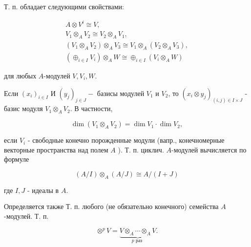 \documentclass[10pt]{article}
\begin{document}
Т. п. обладает следующими свойствами:



\[

\begin{gathered}

A \otimes V^{i} \cong V, \\

V_{1} \otimes_{A} V_{2} \cong V_{2} \otimes_{A} V_{1}, \\

\left(V_{1} \otimes_{A} V_{2}\right) \otimes_{A} V_{3} \cong V_{1} \otimes_{A}\left(V_{2} \otimes_{A} V_{3}\right), \\

\left(\oplus_{i \in I} V_{i}\right) \otimes_{A} W \cong \oplus_{i \in I}\left(V_{i} \otimes_{A} W\right)

\end{gathered}

\]



для любых $A$-модулей $V, V_{i}, W$.



Если $\left(x_{i}\right)_{i \in I}$ И $\left(y_{j}\right)_{j \in J}-$ базисы модулей $V_{1}$ и $V_{2}$, то $\left(x_{i} \otimes y_{j}\right)_{(i, j) \in I \times J}$ - базис модуля $V_{1} \otimes_{A} V_{2}$. В частности,



\[

\operatorname{dim}\left(V_{1} \otimes_{A} V_{2}\right)=\operatorname{dim} V_{1} \cdot \operatorname{dim} V_{2},

\]



если $V_{i}$ - свободные конечно порожденные модули (вапр., конечномерные векторные пространства над полем $A$ ). Т. п. циклич. $A$-модулей вычисляется по формуле



\[

(A / I) \otimes_{A}(A / J) \cong A /(I+J)

\]



где $I, J$ - идеалы в $A$.



Определяется также Т. п. любого (не обязательно конечного) семейства $A$-модулей. Т. п.



\[

\otimes^{p} V=\underbrace{V \otimes_{A} \cdots \otimes_{A} V}_{p \text { раз }} .

\]
\end{document}
